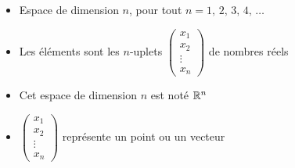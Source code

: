 \begin{frame}

\begin{itemize}
  \item Espace de dimension $n$, pour tout $n = 1,\, 2,\, 3,\, 4,\, \dots$
  \pause  
  \item Les éléments sont les $n$-uplets
$\left(\begin{smallmatrix} x_1\\ x_2 \\ \vdots \\ x_n \end{smallmatrix}\right)$ 
de nombres réels
  \pause  
  \item Cet espace de dimension $n$ est noté $\mathbb{R}^n$
  \pause  
  \item $\left(\begin{smallmatrix} x_1\\ x_2 \\ \vdots \\ x_n \end{smallmatrix}\right)$
  représente un point ou un vecteur
\end{itemize}

\end{frame}



